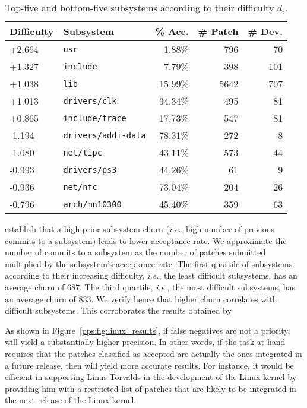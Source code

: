 \begin{table}
	\centering
	\caption{Top-five and bottom-five subsystems according to their difficulty $d_i$.}
	\label{pps:tab:linux_subsystems}
	\begin{tabular}{llrrr}
		\toprule
		Difficulty & Subsystem                  & \% Acc. & \# Patch & \# Dev. \\
		\midrule
		+2.664     & \texttt{usr}               & 1.88\%  & 796      & 70      \\
		+1.327     & \texttt{include}           & 7.79\%  & 398      & 101     \\
		+1.038     & \texttt{lib}               & 15.99\% & 5642     & 707     \\
		+1.013     & \texttt{drivers/clk}       & 34.34\% & 495      & 81      \\
		+0.865     & \texttt{include/trace}     & 17.73\% & 547      & 81      \\
		\midrule
		-1.194     & \texttt{drivers/addi-data} & 78.31\% & 272      & 8       \\
		-1.080     & \texttt{net/tipc}          & 43.11\% & 573      & 44      \\
		-0.993     & \texttt{drivers/ps3}       & 44.26\% & 61       & 9       \\
		-0.936     & \texttt{net/nfc}           & 73.04\% & 204      & 26      \\
		-0.796     & \texttt{arch/mn10300}      & 45.40\% & 359      & 63      \\
		\bottomrule
	\end{tabular}
\end{table}

\citet{jiang2013will} establish that a high prior subsystem churn (\textit{i.e.}, high number of previous commits to a subsystem) leads to lower acceptance rate.
We approximate the number of commits to a subsystem as the number of patches submitted multiplied by the subsystem's acceptance rate.
The first quartile of subsystems according to their increasing difficulty, \textit{i.e.}, the least difficult subsystems, has an average churn of \num{687}.
The third quartile, \textit{i.e.}, the most difficult subsystems, has an average churn of \num{833}.
We verify hence that higher churn correlates with difficult subsystems.
This corroborates the results obtained by~\citeauthor{jiang2013will}

As shown in Figure~\ref{pps:fig:linux_results}, if false negatives are not a priority, \interank{} will yield a substantially higher precision.
In other words, if the task at hand requires that the patches classified as accepted are actually the ones integrated in a future release, then \interank{} will yield more accurate results.
For instance, it would be efficient in supporting Linus Torvalds in the development of the Linux kernel by providing him with a restricted list of patches that are likely to be integrated in the next release of the Linux kernel.
